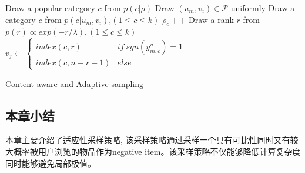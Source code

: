 \IncMargin{1em}
\begin{algorithm}
	\SetAlgoNoLine %
	
	
	\BlankLine
	 Draw a popular category $c$ from $p\left(c|\rho\right)$\;
	 Draw $\left(u_m,v_i\right) \in \mathcal{P}$ uniformly\;
	 Draw a category $c$ from $p\left(c|u_m,v_i\right)$,$\left(1\leq c \leq k\right)$\;
	 $\rho_c ++$\;
	 Draw a rank $r$ from $p\left(r\right) \propto exp\left(-r/\lambda\right),\left(1\leq c \leq k\right)$\;
	 　
	 $v_j \leftarrow 
	 \begin{cases}
	 index\left(c,r\right) & if \ sgn\left(y_{m,c}^u\right) = 1\\
	 index\left(c,n-r-1\right) & else
	 \end{cases}$\;
	 
	\caption{Content-aware and Adaptive sampling}
	\label{al2}
\end{algorithm}
\DecMargin{1em}




\subsection{本章小结}
本章主要介绍了适应性采样策略, 该采样策略通过采样一个具有可比性同时又有较大概率被用户浏览的物品作为negative item。该采样策略不仅能够降低计算复杂度同时能够避免局部极值。

